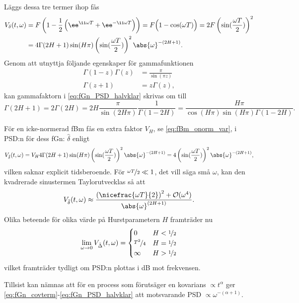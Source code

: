 Läggs dessa tre termer ihop fås
\begin{equation}
\begin{aligned}
    V_{\delta}(t,\omega)
    &= F\left(1-\frac{1}{2}\left(\ee^{\ii \omega T}+\ee^{-\ii \omega T}\right)\right)
    = F\Big( 1-\cos(\omega T) \Big) 
    = 2F\left(\sin(\frac{\omega T}{2})\right)^2 \\
    &= 
    4\Gamma{(2H+1)}
    \sin(H\pi)\left(\sin(\frac{\omega T}{2})\right)^2 \abs{\omega}^{-(2H+1)}. \label{eq:fGn_PSD_halvklar}
\end{aligned}
\end{equation}
Genom att utnyttja följande egenskaper för gammafunktionen
\begin{align}
\Gamma(1-z)\Gamma(z)&=\frac{\pi}{\sin(\pi z)} \\
\Gamma(z+1)&=z\Gamma(z),
\end{align}
kan gammafaktorn i \eqref{eq:fGn_PSD_halvklar} skrivas om till
\begin{equation}
\Gamma(2H+1) 
= 2 \Gamma(2H) = 2H\frac{\pi}{\sin(2H\pi)}\frac{1}{\Gamma(1-2H)} 
= \frac{H\pi}{\cos(H\pi)\sin(H\pi)\Gamma(1-2H)}.
\end{equation}

För en icke-normerad fBm fås en extra faktor $V_H$, se \eqref{eq:fBm_onorm_var}, i PSD:n för dess fGn: $\hat{\delta}$ enligt
\begin{equation}
V_{\hat{\delta}}(t,\omega) 
= V_H 4\Gamma{(2H+1)}\sin(H\pi) \left( \sin(\frac{\omega T}{2}) \right)^2 \abs{\omega}^{-(2H+1)} 
= 4 \left( \sin(\frac{\omega T}{2}) \right) ^2\abs{\omega}^{-(2H+1)},
\end{equation}
vilken saknar explicit tidsberoende. För $\nicefrac{\omega T}{2} \ll 1$, det vill säga små $\omega$, kan den kvadrerade sinustermen Taylorutvecklas så att
\begin{equation}
    V_{\hat{\delta}}(t,\omega) \approx \frac{ \left( \nicefrac{\omega T}{2} \right)^2 + \mathcal{O}(\omega^4) }{\abs{\omega}^{(2H+1)}}.
\end{equation}
Olika beteende för olika värde på Hurstparametern $H$ framträder nu 
\begin{equation}
    \lim\limits_{\omega \to 0} V_{\hat{\Delta}}(t,\omega) = \begin{cases} 
      0 & H<\nicefrac{1}{2} \\
      \nicefrac{T^2}{4} & H=\nicefrac{1}{2} \\
      \infty & H>\nicefrac{1}{2}
   \end{cases}
\end{equation}
vilket framträder tydligt om PSD:n plottas i dB mot frekvensen.

Tillsist kan nämnas att för en process som förutsäger en kovarians $\propto t^{\alpha}$ ger \eqref{eq:fGn_covterm}-\eqref{eq:fGn_PSD_halvklar} att motsvarande PSD $\propto \omega^{-(\alpha+1)}$.






